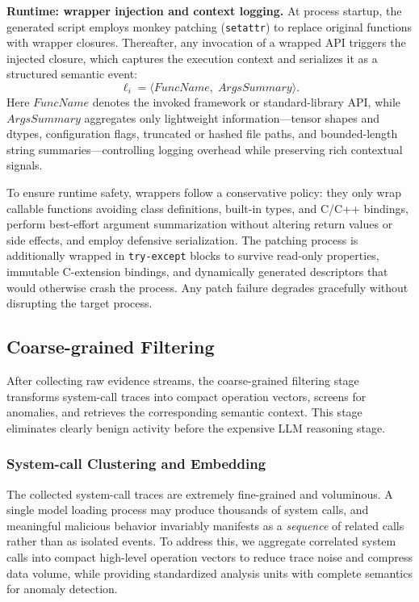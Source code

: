 \noindent \textbf{Runtime: wrapper injection and context logging.}
At process startup, the generated script employs monkey patching (\texttt{setattr}) to replace original functions with wrapper closures. Thereafter, any invocation of a wrapped API triggers the injected closure, which captures the execution context and serializes it as a structured semantic event:
\begin{equation}
\ell_i = \langle \textit{FuncName},\; \textit{ArgsSummary} \rangle.
\end{equation}
Here $\textit{FuncName}$ denotes the invoked framework or standard-library API, while $\textit{ArgsSummary}$ aggregates only lightweight information—tensor shapes and dtypes, configuration flags, truncated or hashed file paths, and bounded-length string summaries—controlling logging overhead while preserving rich contextual signals.

To ensure runtime safety, wrappers follow a conservative policy: they only wrap callable functions avoiding class definitions, built-in types, and C/C++ bindings, perform best-effort argument summarization without altering return values or side effects, and employ defensive serialization. The patching process is additionally wrapped in \texttt{try-except} blocks to survive read-only properties, immutable C-extension bindings, and dynamically generated descriptors that would otherwise crash the process. Any patch failure degrades gracefully without disrupting the target process.

\subsection{Coarse-grained Filtering}

After collecting raw evidence streams, the coarse-grained filtering stage transforms system-call traces into compact operation vectors, screens for anomalies, and retrieves the corresponding semantic context. This stage eliminates clearly benign activity before the expensive LLM reasoning stage.

\subsubsection{System-call Clustering and Embedding}

The collected system-call traces are extremely fine-grained and voluminous. A single model loading process may produce thousands of system calls, and meaningful malicious behavior invariably manifests as a \emph{sequence} of related calls rather than as isolated events. To address this, we aggregate correlated system calls into compact high-level operation vectors to reduce trace noise and compress data volume, while providing standardized analysis units with complete semantics for anomaly detection.

